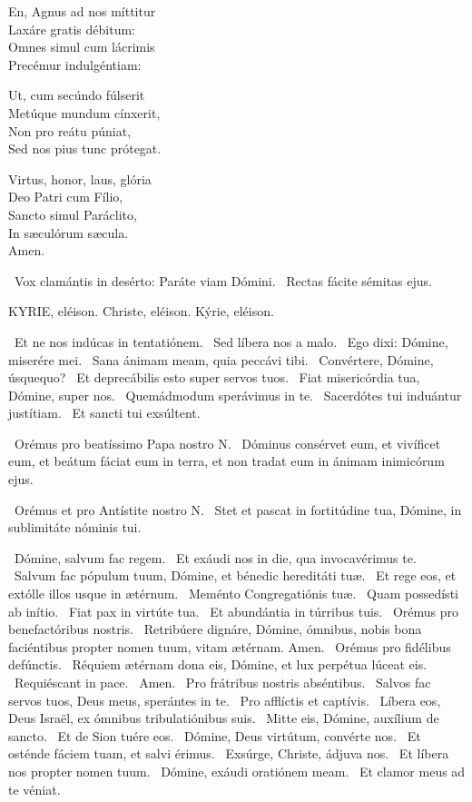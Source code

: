 En, Agnus ad nos míttitur\\
Laxáre gratis débitum:\\
Omnes simul cum lácrimis\\
Precémur indulgéntiam:

Ut, cum secúndo fúlserit\\
Metúque mundum cínxerit,\\
Non pro reátu púniat,\\
Sed nos pius tunc prótegat.

Virtus, honor, laus, glória\\
Deo Patri cum Fílio,\\
Sancto simul Paráclito,\\
In sæculórum sæcula.\\
Amen.

\V\ Vox clamántis in desérto: Paráte viam Dómini. \R\ Rectas fácite sémitas ejus.



\label{feria2:precesferiales}

KYRIE, eléison. Christe, eléison. Kýrie, eléison.

 \V\ Et ne nos indúcas in tentatiónem. \R\ Sed líbera nos a malo. \V\ Ego dixi: Dómine, miserére mei. \R\ Sana ánimam meam, quia peccávi tibi. \V\ Convértere, Dómine, úsquequo? \R\ Et deprecábilis esto super servos tuos. \V\ Fiat misericórdia tua, Dómine, super nos. \R\ Quemádmodum sperávimus in te. \V\ Sacerdótes tui induántur justítiam. \R\ Et sancti tui exsúltent.

\V\ Orémus pro beatíssimo Papa nostro N. \R\ Dóminus consérvet eum, et vivíficet eum, et beátum fáciat eum in terra, et non tradat eum in ánimam inimicórum ejus.

\V\ Orémus et pro Antístite nostro N. \R\ Stet et pascat in fortitúdine tua, Dómine, in sublimitáte nóminis tui.

\V\ Dómine, salvum fac regem. \R\ Et exáudi nos in die, qua invocavérimus te. \V\ Salvum fac pópulum tuum, Dómine, et bénedic hereditáti tuæ. \R\ Et rege eos, et extólle illos usque in ætérnum. \V\ Meménto Congregatiónis tuæ. \R\ Quam possedísti ab inítio. \V\ Fiat pax in virtúte tua. \R\ Et abundántia in túrribus tuis. \V\ Orémus pro benefactóribus nostris. \R\ Retribúere dignáre, Dómine, ómnibus, nobis bona faciéntibus propter nomen tuum, vitam ætérnam. Amen. \V\ Orémus pro fidélibus defúnctis. \R\ Réquiem ætérnam dona eis, Dómine, et lux perpétua lúceat eis. \V\ Requiéscant in pace. \R\ Amen. \V\ Pro frátribus nostris abséntibus. \R\ Salvos fac servos tuos, Deus meus, sperántes in te. \V\ Pro afflíctis et captívis. \R\ Líbera eos, Deus Israël, ex ómnibus tribulatiónibus suis. \V\ Mitte eis, Dómine, auxílium de sancto. \R\ Et de Sion tuére eos. \V\ Dómine, Deus virtútum, convérte nos. \R\ Et osténde fáciem tuam, et salvi érimus. \V\ Exsúrge, Christe, ádjuva nos. \R\ Et líbera nos propter nomen tuum. \V\ Dómine, exáudi oratiónem meam. \R\ Et clamor meus ad te véniat.

